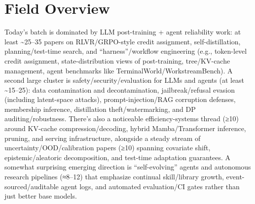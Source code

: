 \documentclass[12pt,letterpaper]{article}
\begin{document}
\section*{Field Overview}
{\footnotesize Today's batch is dominated by LLM post-training + agent reliability work: at least \textasciitilde{}25--35 papers on RLVR/GRPO-style credit assignment, self-distillation, planning/test-time search, and ``harness''/workflow engineering (e.g., token-level credit assignment, state-distribution views of post-training, tree/KV-cache management, agent benchmarks like TerminalWorld/WorkstreamBench). A second large cluster is safety/security/evaluation for LLMs and agents (at least \textasciitilde{}15--25): data contamination and decontamination, jailbreak/refusal evasion (including latent-space attacks), prompt-injection/RAG corruption defenses, membership inference, distillation theft/watermarking, and DP auditing/robustness. There's also a noticeable efficiency-systems thread (≥10) around KV-cache compression/decoding, hybrid Mamba/Transformer inference, pruning, and serving infrastructure, alongside a steady stream of uncertainty/OOD/calibration papers (≥10) spanning covariate shift, epistemic/aleatoric decomposition, and test-time adaptation guarantees. A somewhat surprising emerging direction is ``self-evolving'' agents and autonomous research pipelines (≈8--12) that emphasize continual skill/library growth, event-sourced/auditable agent logs, and automated evaluation/CI gates rather than just better base models.}
\end{document}
